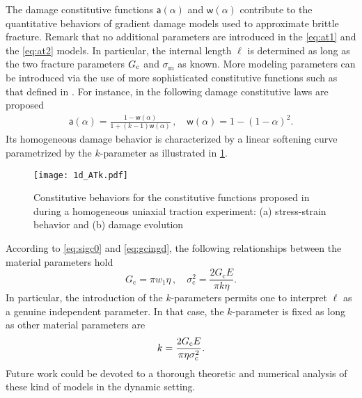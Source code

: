 The damage constitutive functions $\mathsf{a}(\alpha)$ and $\mathsf{w}(\alpha)$ contribute to the quantitative behaviors of gradient damage models used to approximate brittle fracture. Remark that no additional parameters are introduced in the \eqref{eq:at1} and the \eqref{eq:at2} models. In particular, the internal length $\ell$ is determined as long as the two fracture parameters $G_\mathrm{c}$ and $\sigma_\mathrm{m}$ as known. More modeling parameters can be introduced via the use of more sophisticated constitutive functions such as that defined in \cite{LorentzCuvilliezKazymyrenko:2012,AlessiMarigoVidoli:2015}. For instance, in \cite{AlessiMarigoVidoli:2015} the following damage constitutive laws are proposed
\begin{align*}
\mathsf{a}(\alpha)=\frac{1-\mathsf{w}(\alpha)}{1+(k-1)\mathsf{w}(\alpha)}\,,\quad \mathsf{w}(\alpha)=1-(1-\alpha)^2.
\end{align*}
Its homogeneous damage behavior is characterized by a linear softening curve parametrized by the $k$-parameter as illustrated in \cref{fig:atk}.
\begin{figure}[htbp]
\centering
\texttt{[image: 1d\_ATk.pdf]}
\caption{Constitutive behaviors for the constitutive functions proposed in \cite{AlessiMarigoVidoli:2015} during a homogeneous uniaxial traction experiment: (a) stress-strain behavior and (b) damage evolution} \label{fig:atk}
\end{figure}
According to \eqref{eq:sigc0} and \eqref{eq:gcingd}, the following relationships between the material parameters hold
\[
G_\mathrm{c}=\pi w_1\eta\,,\quad \sigma_\mathrm{c}^2=\frac{2G_\mathrm{c}E}{\pi k\eta}.
\]
In particular, the introduction of the $k$-parameters permits one to interpret $\ell$ as a genuine independent parameter. In that case, the $k$-parameter is fixed as long as other material parameters are
\[
k=\frac{2G_\mathrm{c} E}{\pi\eta\sigma_\mathrm{c}^2}.
\]
Future work could be devoted to a thorough theoretic and numerical analysis of these kind of models in the dynamic setting.

